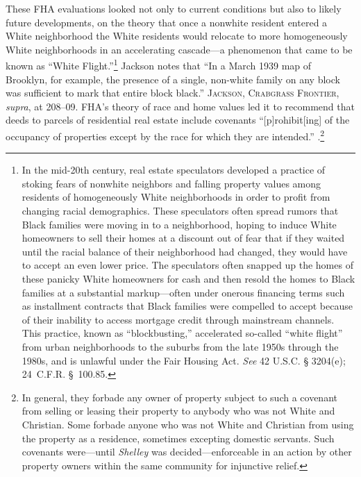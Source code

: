 These FHA evaluations looked not only to current conditions but also to likely
future developments, on the theory that once a nonwhite resident entered a
White neighborhood the White residents would relocate to more homogeneously
White neighborhoods in an accelerating cascade---a phenomenon that came to be
known as ``White Flight.''\footnote{In the mid-20th century,
real estate speculators developed a practice of stoking fears of nonwhite
neighbors and falling property values among residents of homogeneously White
neighborhoods in order to profit from changing racial demographics. These
speculators often spread rumors that Black families were moving in to a
neighborhood, hoping to induce White homeowners to sell their homes at a
discount out of fear that if they waited until the racial balance of their
neighborhood had changed, they would have to accept an even lower price. The
speculators often snapped up the homes of these panicky White homeowners for
cash and then resold the homes to Black families at a substantial
markup---often under onerous financing terms such as installment contracts that
Black families were compelled to accept because of their inability to access
mortgage credit through mainstream channels. This practice, known as
``blockbusting,'' accelerated so-called ``white flight'' from urban
neighborhoods to the suburbs from the late 1950s through the 1980s, and is
unlawful under the Fair Housing Act. \textit{See} 42 U.S.C. {\S} 3204(e);
24~C.F.R. \S~100.85.} Jackson notes that ``In a March 1939 map of Brooklyn,
for example, the presence of a single, non-white family on any block was
sufficient to mark that entire block black.'' \textsc{Jackson, Crabgrass
Frontier}, \textit{supra}, at 208--09. FHA's theory of race and home
values led it to recommend that deeds to parcels of residential real estate
include covenants ``[p]rohibit[ing] of the occupancy of properties except by
the race for which they are intended.''
.\footnote{
In general, they forbade any owner of property subject
to such a covenant from selling or leasing their property to anybody who was
not White and Christian. Some forbade anyone who was not White and Christian
from using the property as a residence, sometimes excepting domestic servants.
Such covenants were---until \textit{Shelley} was decided---enforceable in an
action by other property owners within the same community for injunctive
relief.}

